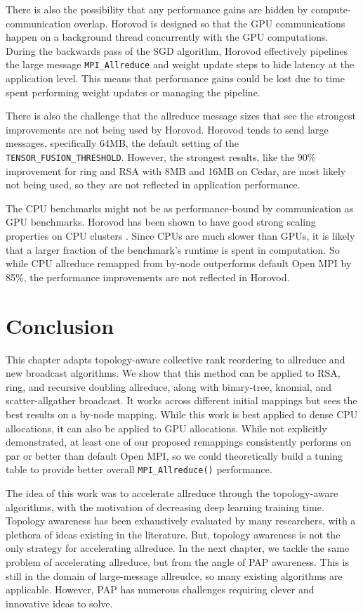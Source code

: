 There is also the possibility that any performance gains are hidden by compute-communication overlap.
Horovod is designed so that the \gls{GPU} communications happen on a background thread concurrently with the \gls{GPU} computations. 
During the backwards pass of the \gls{SGD} algorithm, Horovod effectively pipelines the large message \texttt{MPI\_Allreduce} and weight update steps to hide latency at the application level.
This means that performance gains could be lost due to time spent performing weight updates or managing the pipeline. 

There is also the challenge that the allreduce message sizes that see the strongest improvements are not being used by Horovod.
Horovod tends to send large messages, specifically 64MB, the default setting of the \texttt{TENSOR\_FUSION\_THRESHOLD}.
However, the strongest results, like the 90\% improvement for ring and \gls{RSA} with 8MB and 16MB on Cedar, are most likely not being used, so they are not reflected in application performance.

The \gls{CPU} benchmarks might not be as performance-bound by communication as \gls{GPU} benchmarks.
Horovod has been shown to have good strong scaling properties on \gls{CPU} clusters \cite{Jain2019ScaleTFPTMXNonFrontera}.
Since \gls{CPU}s are much slower than \gls{GPU}s, it is likely that a larger fraction of the benchmark's runtime is spent in computation.
So while \gls{CPU} allreduce remapped from by-node outperforms default Open MPI by 85\%, the performance improvements are not reflected in Horovod. 

\section{Conclusion}
This chapter adapts topology-aware collective rank reordering to allreduce and new broadcast algorithms.
We show that this method can be applied to \gls{RSA}, ring, and recursive doubling allreduce, along with binary-tree, knomial, and scatter-allgather broadcast.
It works across different initial mappings but sees the best results on a by-node mapping.
While this work is best applied to dense \gls{CPU} allocations, it can also be applied to \gls{GPU} allocations. 
While not explicitly demonstrated, at least one of our proposed remappings consistently performs on par or better than default Open MPI, so we could theoretically build a tuning table to provide better overall \texttt{MPI\_Allreduce()} performance. 

The idea of this work was to accelerate allreduce through the topology-aware algorithms, with the motivation of decreasing deep learning training time.
Topology awareness has been exhaustively evaluated by many researchers, with a plethora of ideas existing in the literature.
But, topology awareness is not the only strategy for accelerating allreduce.
In the next chapter, we tackle the same problem of accelerating allreduce, but from the angle of PAP awareness.
This is still in the domain of large-message allreudce, so many existing algorithms are applicable. 
However, \gls{PAP} has numerous challenges requiring clever and innovative ideas to solve.
